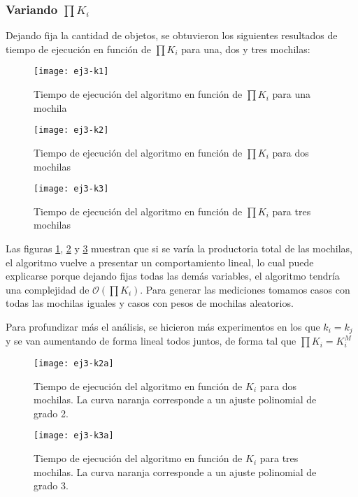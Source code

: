\subsubsection{Variando $\prod K_i$}

Dejando fija la cantidad de objetos, se obtuvieron los siguientes resultados de tiempo de ejecución en función de $\prod K_i$ para una, dos y tres mochilas:

\begin{figure}[H]
		\centering
		\texttt{[image: ej3-k1]}
		\caption{Tiempo de ejecución del algoritmo en función de $\prod K_i$ para una mochila}
		\label{fig:ej3-k1-fig}
	\end{figure}

\begin{figure}[H]
		\centering
		\texttt{[image: ej3-k2]}
		\caption{Tiempo de ejecución del algoritmo en función de $\prod K_i$ para dos mochilas}
		\label{fig:ej3-k2-fig}
	\end{figure}

\begin{figure}[H]
		\centering
		\texttt{[image: ej3-k3]}
		\caption{Tiempo de ejecución del algoritmo en función de $\prod K_i$ para tres mochilas}
		\label{fig:ej3-k3-fig}
	\end{figure}	

Las figuras \ref{fig:ej3-k1-fig}, \ref{fig:ej3-k2-fig} y \ref{fig:ej3-k3-fig} muestran que si se varía la productoria total de las mochilas, el algoritmo vuelve a presentar un comportamiento lineal, lo cual puede explicarse porque dejando fijas todas las demás variables, el algoritmo tendría una complejidad de $\mathcal{O}(\prod K_i)$. Para generar las mediciones tomamos casos con todas las mochilas iguales y casos con pesos de mochilas aleatorios.

\newpage

Para profundizar más el análisis, se hicieron más experimentos en los que $k_i = k_j$ y se van aumentando de forma lineal todos juntos, de forma tal que $\prod K_i = K_i^M$

\begin{figure}[H]
		\centering
		\texttt{[image: ej3-k2a]}
		\caption{Tiempo de ejecución del algoritmo en función de $K_i$ para dos mochilas. La curva naranja corresponde a un ajuste polinomial de grado 2.}
		\label{fig:ej3-k2a-fig}
	\end{figure}	

\begin{figure}[H]
		\centering
		\texttt{[image: ej3-k3a]}
		\caption{Tiempo de ejecución del algoritmo en función de $K_i$ para tres mochilas. La curva naranja corresponde a un ajuste polinomial de grado 3.}
		\label{fig:ej3-k3a-fig}
	\end{figure}	

